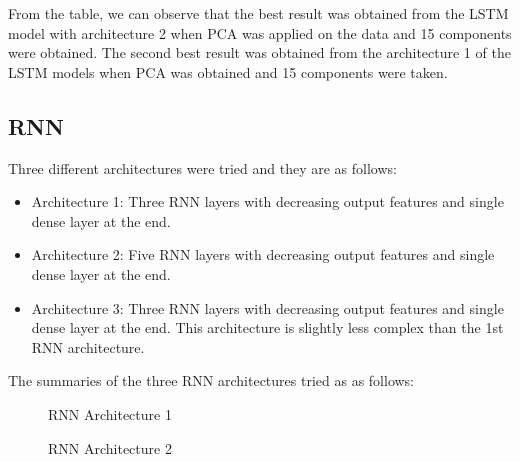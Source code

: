 From the table, we can observe that the best result was obtained from the LSTM model with architecture 2 when PCA was applied on the data and 15 components were obtained. The second best result was obtained from the architecture 1 of the LSTM models when PCA was obtained and 15 components were taken.

\subsection{RNN}

Three different architectures were tried and they are as follows:
 \begin{itemize}
     \item Architecture 1: Three RNN layers with decreasing output features and single dense layer at the end.
     \item Architecture 2: Five RNN layers with decreasing output features and single dense layer at the end.
     \item Architecture 3: Three RNN layers with decreasing output features and single dense layer at the end. This architecture is slightly less complex than the 1st RNN architecture.
 \end{itemize}
 
 The summaries of the three RNN architectures tried as as follows:
 
 \begin{figure}
%
  \caption{RNN Architecture 1}
  \label{fig:key}
\end{figure}

\begin{figure}
%
  \caption{RNN Architecture 2}
  \label{fig:key}
\end{figure}

